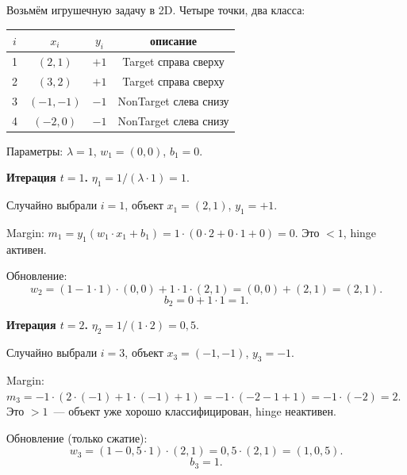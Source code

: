 \documentclass[12pt,a4paper]{article}
\begin{document}
Возьмём игрушечную задачу в 2D. Четыре точки, два класса:
\begin{center}
\begin{tabular}{cccc}
\toprule
$i$ & $x_i$ & $y_i$ & описание\\
\midrule
1 & $(2, 1)$ & $+1$ & Target справа сверху\\
2 & $(3, 2)$ & $+1$ & Target справа сверху\\
3 & $(-1, -1)$ & $-1$ & NonTarget слева снизу\\
4 & $(-2, 0)$ & $-1$ & NonTarget слева снизу\\
\bottomrule
\end{tabular}
\end{center}

Параметры: $\lambda = 1$, $w_1 = (0, 0)$, $b_1 = 0$.

\textbf{Итерация $t = 1$.} $\eta_1 = 1/(\lambda \cdot 1) = 1$.

Случайно выбрали $i = 1$, объект $x_1 = (2, 1)$, $y_1 = +1$.

Margin: $m_1 = y_1(w_1 \cdot x_1 + b_1) = 1 \cdot (0 \cdot 2 + 0 \cdot 1 + 0) = 0$. Это $< 1$, hinge активен.

Обновление:
\[
  w_2 = (1 - 1 \cdot 1) \cdot (0, 0) + 1 \cdot 1 \cdot (2, 1) = (0, 0) + (2, 1) = (2, 1).
\]
\[
  b_2 = 0 + 1 \cdot 1 = 1.
\]

\textbf{Итерация $t = 2$.} $\eta_2 = 1/(1 \cdot 2) = 0{,}5$.

Случайно выбрали $i = 3$, объект $x_3 = (-1, -1)$, $y_3 = -1$.

Margin: $m_3 = -1 \cdot (2 \cdot (-1) + 1 \cdot (-1) + 1) = -1 \cdot (-2 - 1 + 1) = -1 \cdot (-2) = 2$. Это $> 1$~--- объект уже хорошо классифицирован, hinge неактивен.

Обновление (только сжатие):
\[
  w_3 = (1 - 0{,}5 \cdot 1) \cdot (2, 1) = 0{,}5 \cdot (2, 1) = (1, 0{,}5).
\]
\[
  b_3 = 1.
\]
\end{document}
